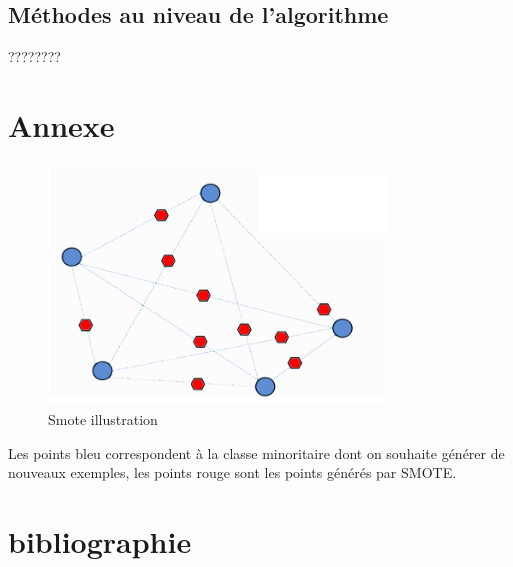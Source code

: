 \documentclass[a4paper,12pt]{article}
\begin{document}
\subsection{Méthodes au niveau de l'algorithme }
????????





\newpage

\section*{Annexe}

\begin{figure}[h!]
    \centering
    \includegraphics[width=0.8\textwidth]{images/smote.png}
    \caption{Smote illustration}
    \label{fig:example}
\end{figure}
Les points bleu correspondent à la classe minoritaire dont on souhaite générer de nouveaux exemples, les points rouge sont les points générés par SMOTE.


\newpage
\section*{bibliographie}
\end{document}

